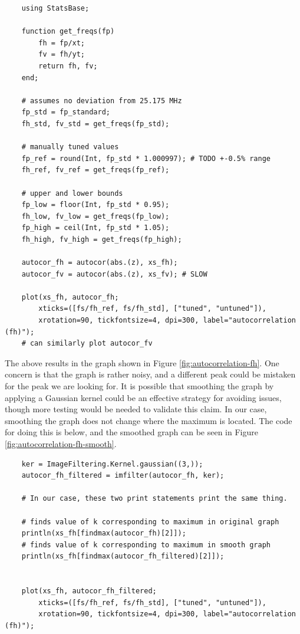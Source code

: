 \documentclass{article}
\begin{document}
\begin{verbatim}
    using StatsBase;

    function get_freqs(fp)
        fh = fp/xt;
        fv = fh/yt;
        return fh, fv;
    end;

    # assumes no deviation from 25.175 MHz
    fp_std = fp_standard;
    fh_std, fv_std = get_freqs(fp_std);

    # manually tuned values
    fp_ref = round(Int, fp_std * 1.000997); # TODO +-0.5% range
    fh_ref, fv_ref = get_freqs(fp_ref);

    # upper and lower bounds
    fp_low = floor(Int, fp_std * 0.95);
    fh_low, fv_low = get_freqs(fp_low);
    fp_high = ceil(Int, fp_std * 1.05);
    fh_high, fv_high = get_freqs(fp_high);

    autocor_fh = autocor(abs.(z), xs_fh);
    autocor_fv = autocor(abs.(z), xs_fv); # SLOW

    plot(xs_fh, autocor_fh;
        xticks=([fs/fh_ref, fs/fh_std], ["tuned", "untuned"]),
        xrotation=90, tickfontsize=4, dpi=300, label="autocorrelation (fh)");
    # can similarly plot autocor_fv
\end{verbatim}

The above results in the graph shown in Figure \ref{fig:autocorrelation-fh}. One concern is that the graph is rather noisy, and a different peak could be mistaken for the peak we are looking for. It is possible that smoothing the graph by applying a Gaussian kernel could be an effective strategy for avoiding issues, though more testing would be needed to validate this claim. In our case, smoothing the graph does not change where the maximum is located. The code for doing this is below, and the smoothed graph can be seen in Figure \ref{fig:autocorrelation-fh-smooth}.

\begin{verbatim}
    ker = ImageFiltering.Kernel.gaussian((3,));
    autocor_fh_filtered = imfilter(autocor_fh, ker);

    # In our case, these two print statements print the same thing.

    # finds value of k corresponding to maximum in original graph
    println(xs_fh[findmax(autocor_fh)[2]]);
    # finds value of k corresponding to maximum in smooth graph
    println(xs_fh[findmax(autocor_fh_filtered)[2]]);


    plot(xs_fh, autocor_fh_filtered;
        xticks=([fs/fh_ref, fs/fh_std], ["tuned", "untuned"]),
        xrotation=90, tickfontsize=4, dpi=300, label="autocorrelation (fh)");
\end{verbatim}
\end{document}
